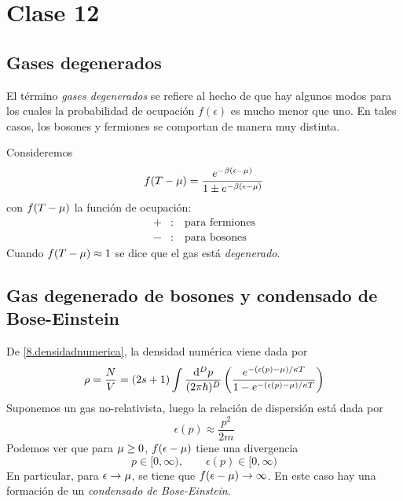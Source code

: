 \section{Clase 12}
\subsection{Gases degenerados}
El término \textit{gases degenerados} se refiere al hecho de que hay algunos modos para los cuales la probabilidad de ocupación $f(\epsilon)$ es mucho menor que uno. En tales casos, los bosones y fermiones se comportan de manera muy distinta.

Consideremos
\begin{equation}
  f(T-\mu )=\frac{e^{-\beta (\epsilon-\mu )}}{1\pm e^{-\beta (\epsilon-\mu )}}
\end{equation}
con $f(T-\mu )$ la función de ocupación:
\begin{align}
  +&:\quad \text{para fermiones}\\
  -&:\quad \text{para bosones}
\end{align}
Cuando $f(T-\mu )\approx 1$ se dice que el gas está \textit{degenerado}.

\subsection{Gas degenerado de bosones y condensado de Bose-Einstein}
De \eqref{8.densidadnumerica}, la densidad numérica viene dada por
\begin{equation}
  \rho=\frac{N}{V}=(2s+1)\int \frac{\dd^Dp}{(2\pi \hbar)^D}\left(\frac{e^{-(\epsilon(p)-\mu)/\kappa T }}{1-e^{-(\epsilon(p)-\mu )/\kappa T}}\right)
\end{equation}
Suponemos un gas no-relativista, luego la relación de dispersión está dada por
\begin{equation}
  \epsilon(p)\approx \frac{p^2}{2m}
\end{equation}
Podemos ver que para $\mu \geq 0$, $f(\epsilon-\mu )$ tiene una divergencia
\begin{equation}
  p\in [0,\infty),\qquad \epsilon(p)\in [0,\infty)
\end{equation}
En particular, para $\epsilon\to \mu $, se tiene que $f(\epsilon-\mu )\to \infty$. En este caso hay una formación de un \textit{condensado de Bose-Einstein}.

